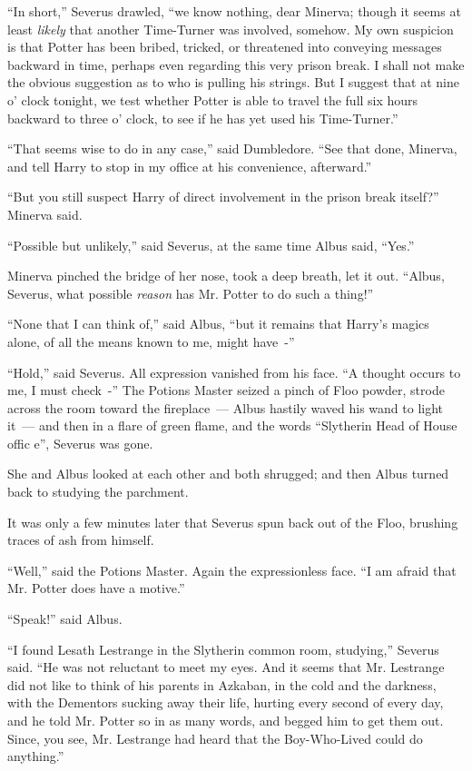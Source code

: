 ``In short,'' Severus drawled, ``we know nothing, dear Minerva; though it seems at least \emph{likely} that another Time-Turner was involved, somehow. My own suspicion is that Potter has been bribed, tricked, or threatened into conveying messages backward in time, perhaps even regarding this very prison break. I shall not make the obvious suggestion as to who is pulling his strings. But I suggest that at nine o' clock tonight, we test whether Potter is able to travel the full six hours backward to three o' clock, to see if he has yet used his Time-Turner.''

``That seems wise to do in any case,'' said Dumbledore. ``See that done, Minerva, and tell Harry to stop in my office at his convenience, afterward.''

``But you still suspect Harry of direct involvement in the prison break itself?'' Minerva said.

``Possible but unlikely,'' said Severus, at the same time Albus said, ``Yes.''

Minerva pinched the bridge of her nose, took a deep breath, let it out. ``Albus, Severus, what possible \emph{reason} has Mr. Potter to do such a thing!''

``None that I can think of,'' said Albus, ``but it remains that Harry's magics alone, of all the means known to me, might have~-''

``Hold,'' said Severus. All expression vanished from his face. ``A thought occurs to me, I must check~-'' The Potions Master seized a pinch of Floo powder, strode across the room toward the fireplace~--- Albus hastily waved his wand to light it~--- and then in a flare of green flame, and the words ``Slytherin Head of House offic e'', Severus was gone.

She and Albus looked at each other and both shrugged; and then Albus turned back to studying the parchment.

It was only a few minutes later that Severus spun back out of the Floo, brushing traces of ash from himself.

``Well,'' said the Potions Master. Again the expressionless face. ``I am afraid that Mr. Potter does have a motive.''

``Speak!'' said Albus.

``I found Lesath Lestrange in the Slytherin common room, studying,'' Severus said. ``He was not reluctant to meet my eyes. And it seems that Mr. Lestrange did not like to think of his parents in Azkaban, in the cold and the darkness, with the Dementors sucking away their life, hurting every second of every day, and he told Mr. Potter so in as many words, and begged him to get them out. Since, you see, Mr. Lestrange had heard that the Boy-Who-Lived could do anything.''

